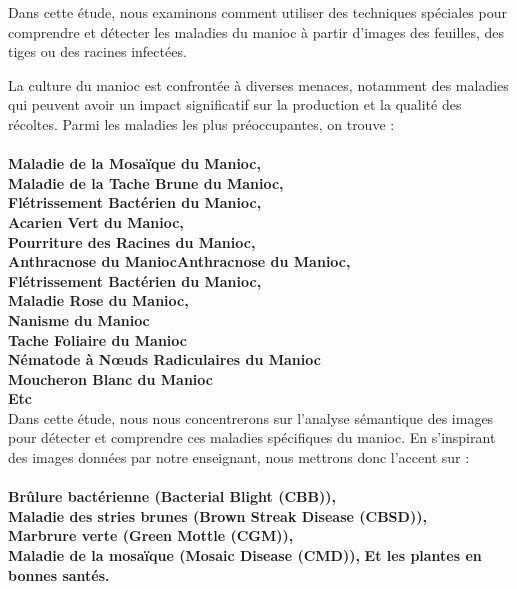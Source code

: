 \quad Dans cette étude, nous examinons comment utiliser des techniques spéciales pour comprendre et détecter les maladies du manioc à partir d'images des feuilles, des tiges ou des racines infectées.

\quad La culture du manioc est confrontée à diverses menaces, notamment des maladies qui peuvent avoir un impact significatif sur la production et la qualité des récoltes. Parmi les maladies les plus préoccupantes\cite{msikita_lutte_nodate}, on trouve : \\ \\
\textemdash \textbf{  Maladie de la Mosaïque du Manioc, } \\
\textemdash \textbf{ Maladie de la Tache Brune du Manioc, } \\
\textemdash \textbf{ Flétrissement Bactérien du Manioc, } \\
\textemdash \textbf{ Acarien Vert du Manioc, } \\
\textemdash \textbf{  Pourriture des Racines du Manioc, } \\
\textemdash \textbf{ Anthracnose du ManiocAnthracnose du Manioc, } \\
\textemdash \textbf{ Flétrissement Bactérien du Manioc, } \\
\textemdash \textbf{ Maladie Rose du Manioc, } \\
\textemdash \textbf{ Nanisme du Manioc } \\
\textemdash \textbf{ Tache Foliaire du Manioc } \\	
\textemdash \textbf{ Nématode à Nœuds Radiculaires du Manioc } \\	
\textemdash \textbf{ Moucheron Blanc du Manioc } \\	
\textemdash \textbf{ Etc } \\	

Dans cette étude, nous nous concentrerons sur l'analyse sémantique des images pour détecter et comprendre ces maladies spécifiques du manioc. En s'inspirant des images données par notre enseignant, nous mettrons donc l'accent sur : \\ \\
\textemdash \textbf{ Brûlure bactérienne (Bacterial Blight (CBB)), } \\
\textemdash \textbf{ Maladie des stries brunes (Brown Streak Disease (CBSD)), } \\
\textemdash \textbf{ Marbrure verte (Green Mottle (CGM)), } \\
\textemdash \textbf{ Maladie de la mosaïque (Mosaic Disease (CMD)), } \textemdash \textbf{ Et les plantes en bonnes santés. }
\\

